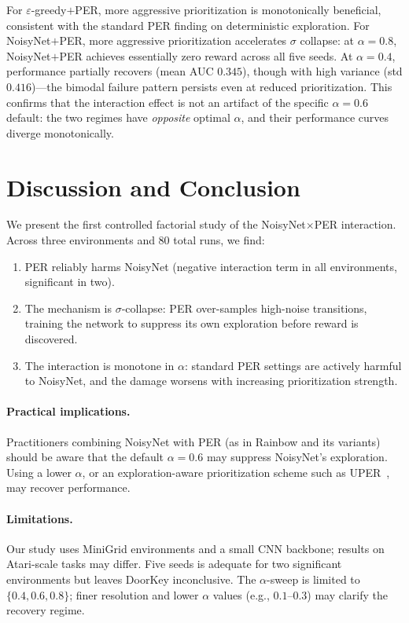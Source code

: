 \documentclass{article}
\begin{document}
For $\varepsilon$-greedy$+$PER, more aggressive prioritization is
monotonically beneficial, consistent with the standard PER finding on
deterministic exploration.
For NoisyNet$+$PER, more aggressive prioritization accelerates $\sigma$
collapse: at $\alpha=0.8$, NoisyNet$+$PER achieves essentially zero reward
across all five seeds.
At $\alpha=0.4$, performance partially recovers (mean AUC $0.345$), though
with high variance (std $0.416$)---the bimodal failure pattern persists even
at reduced prioritization.
This confirms that the interaction effect is not an artifact of the specific
$\alpha=0.6$ default: the two regimes have \emph{opposite} optimal $\alpha$,
and their performance curves diverge monotonically.

\section{Discussion and Conclusion}

We present the first controlled factorial study of the NoisyNet$\times$PER
interaction.
Across three environments and 80 total runs, we find:
\begin{enumerate}
\item PER reliably harms NoisyNet (negative interaction term in all
      environments, significant in two).
\item The mechanism is $\sigma$-collapse: PER over-samples high-noise
      transitions, training the network to suppress its own exploration before
      reward is discovered.
\item The interaction is monotone in $\alpha$: standard PER settings are
      actively harmful to NoisyNet, and the damage worsens with increasing
      prioritization strength.
\end{enumerate}

\paragraph{Practical implications.}
Practitioners combining NoisyNet with PER (as in Rainbow and its variants)
should be aware that the default $\alpha=0.6$ may suppress NoisyNet's
exploration.
Using a lower $\alpha$, or an exploration-aware prioritization scheme such as
UPER~\cite{carrasco2025uper}, may recover performance.

\paragraph{Limitations.}
Our study uses MiniGrid environments and a small CNN backbone; results on
Atari-scale tasks may differ.
Five seeds is adequate for two significant environments but leaves DoorKey
inconclusive.
The $\alpha$-sweep is limited to $\{0.4, 0.6, 0.8\}$; finer resolution and
lower $\alpha$ values (e.g., $0.1$--$0.3$) may clarify the recovery regime.
\end{document}
